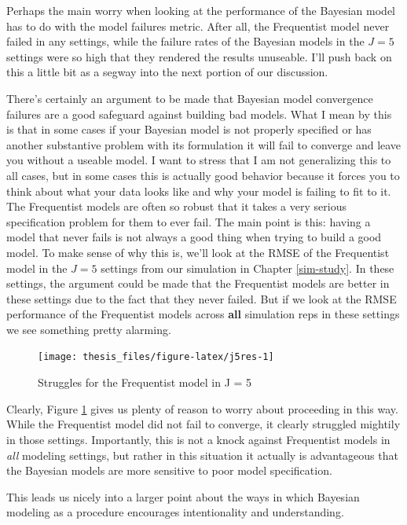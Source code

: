 \documentclass[12pt,twoside]{reedthesis}
\begin{document}
Perhaps the main worry when looking at the performance of the Bayesian model has to do with the model failures metric. After all, the Frequentist model never failed in any settings, while the failure rates of the Bayesian models in the \(J=5\) settings were so high that they rendered the results unuseable. I'll push back on this a little bit as a segway into the next portion of our discussion.

There's certainly an argument to be made that Bayesian model convergence failures are a good safeguard against building bad models. What I mean by this is that in some cases if your Bayesian model is not properly specified or has another substantive problem with its formulation it will fail to converge and leave you without a useable model. I want to stress that I am not generalizing this to all cases, but in some cases this is actually good behavior because it forces you to think about what your data looks like and why your model is failing to fit to it. The Frequentist models are often so robust that it takes a very serious specification problem for them to ever fail. The main point is this: having a model that never fails is not always a good thing when trying to build a good model. To make sense of why this is, we'll look at the RMSE of the Frequentist model in the \(J = 5\) settings from our simulation in Chapter \ref{sim-study}. In these settings, the argument could be made that the Frequentist models are better in these settings due to the fact that they never failed. But if we look at the RMSE performance of the Frequentist models across \textbf{all} simulation reps in these settings we see something pretty alarming.
\begin{figure}

{\centering \texttt{[image: thesis\_files/figure-latex/j5res-1]} 

}

\caption{Struggles for the Frequentist model in J = 5}\label{fig:j5res}
\end{figure}
Clearly, Figure \ref{fig:j5res} gives us plenty of reason to worry about proceeding in this way. While the Frequentist model did not fail to converge, it clearly struggled mightily in those settings. Importantly, this is not a knock against Frequentist models in \emph{all} modeling settings, but rather in this situation it actually is advantageous that the Bayesian models are more sensitive to poor model specification.

This leads us nicely into a larger point about the ways in which Bayesian modeling as a procedure encourages intentionality and understanding.
\end{document}
